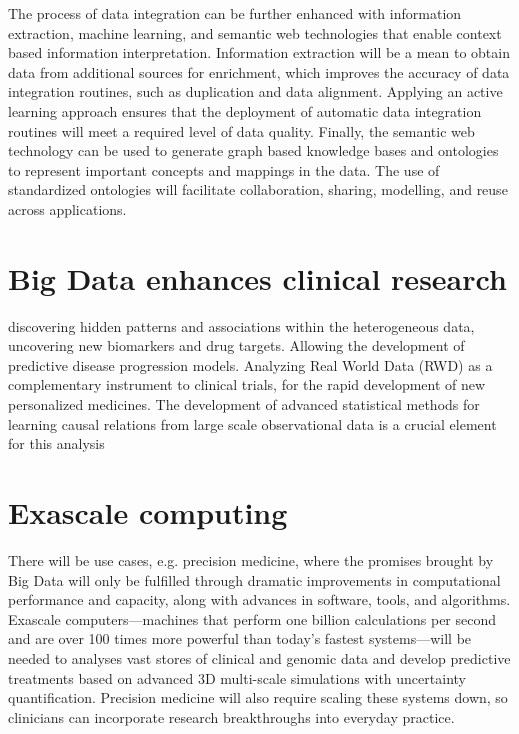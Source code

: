 \documentclass[sigconf]{acmart}
\begin{document}
The process of data integration can be further enhanced with information extraction, machine learning, and semantic web technologies that enable context based information interpretation. Information extraction will be a mean to obtain data from additional sources for enrichment, which improves the accuracy of data integration routines, such as duplication and data alignment. Applying an active learning approach ensures that the deployment of automatic data integration routines will meet a required level of data quality. Finally, the semantic web technology can be used to generate graph based knowledge bases and ontologies to represent important concepts and mappings in the data. The use of standardized ontologies will facilitate collaboration, sharing, modelling, and reuse
across applications. 

\section{Big Data enhances clinical research}
discovering hidden patterns and associations within the heterogeneous data, uncovering new
biomarkers and drug targets. Allowing the development of predictive disease progression models. Analyzing Real World Data (RWD) as a complementary instrument to clinical trials, for the rapid development of new personalized medicines. The development of advanced statistical methods for learning causal relations from large scale observational data is a crucial element
for this analysis

\section{Exascale computing}
There will be use cases, e.g. precision medicine, where the promises brought by Big Data will only be fulfilled through dramatic improvements in computational performance and capacity, along with advances in software, tools, and algorithms. Exascale computers—machines that perform one billion calculations per second and are over 100 times more powerful than today’s fastest systems—will be needed to analyses vast stores of clinical and genomic data and develop predictive treatments based on advanced 3D multi-scale simulations with uncertainty quantification. Precision medicine will also
require scaling these systems down, so clinicians can incorporate research breakthroughs into everyday practice.
\end{document}
